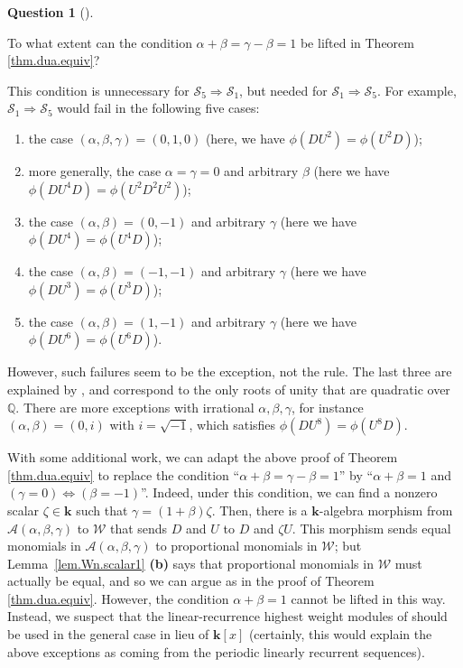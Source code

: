 \documentclass[numbers=enddot,12pt,final,onecolumn,notitlepage]{scrartcl}%
\theoremstyle{definition}
\newtheorem{quest}[theo]{Question}
\newenvironment{question}[1][]
{\begin{quest}[#1]\begin{leftbar}}
{\end{leftbar}\end{quest}}
\newcommand{\W}{\mathcal{W}}
\newcommand{\kk}{\mathbf{k}}
\newcommand{\QQ}{\mathbb{Q}}
\newcommand{\tup}[1]{\left( #1 \right)}
\newcommand{\ive}[1]{\left[ #1 \right]}
\begin{document}
\begin{question}
To what extent can the condition $\alpha+\beta=\gamma-\beta=1$ be lifted in
Theorem \ref{thm.dua.equiv}?
\end{question}

This condition is unnecessary for $\mathcal{S}_{5}\Longrightarrow
\mathcal{S}_{1}$, but needed for $\mathcal{S}_{1}\Longrightarrow
\mathcal{S}_{5}$. For example, $\mathcal{S}_{1}\Longrightarrow\mathcal{S}_{5}$
would fail in the following five cases:
\begin{enumerate}
\item the case $\tup{\alpha, \beta, \gamma} = \tup{0, 1, 0}$ (here, we have $\phi\tup{DU^2} = \phi\tup{U^2D}$);
\item more generally, the case $\alpha = \gamma = 0$ and arbitrary $\beta$ (here we have $\phi\tup{DU^4D} = \phi\tup{U^2D^2U^2}$);
\item the case $\tup{\alpha, \beta} = \tup{0, -1}$ and arbitrary $\gamma$ (here we have $\phi\tup{DU^4} = \phi\tup{U^4D}$);
\item the case $\tup{\alpha, \beta} = \tup{-1, -1}$ and arbitrary $\gamma$ (here we have $\phi\tup{DU^3} = \phi\tup{U^3D}$);
\item the case $\tup{\alpha, \beta} = \tup{1, -1}$ and arbitrary $\gamma$ (here we have $\phi\tup{DU^6} = \phi\tup{U^6D}$).
\end{enumerate}
However, such failures seem to be the
exception, not the rule.
The last three are explained by \cite[Theorem 1.3 (f)]{Zhao99}, and correspond to the only roots of unity that are quadratic over $\QQ$.
There are more exceptions with irrational $\alpha, \beta, \gamma$, for instance $\tup{\alpha, \beta} = \tup{0, i}$ with $i = \sqrt{-1}$, which satisfies $\phi\tup{DU^8} = \phi\tup{U^8D}$.

With some additional work, we can adapt the above proof of Theorem \ref{thm.dua.equiv} to replace the condition ``$\alpha+\beta=\gamma-\beta=1$'' by ``$\alpha + \beta = 1$ and $\left(\gamma = 0\right) \Longleftrightarrow \left(\beta = -1\right)$''.
Indeed, under this condition, we can find a nonzero scalar $\zeta \in \kk$ such that $\gamma = \tup{1+\beta}\zeta$.
Then, there is a $\kk$-algebra morphism from $\mathcal{A}\tup{\alpha, \beta, \gamma}$ to $\W$ that sends $D$ and $U$ to $D$ and $\zeta U$.
This morphism sends equal monomials in $\mathcal{A}\tup{\alpha, \beta, \gamma}$ to proportional monomials in $\W$;
but Lemma~\ref{lem.Wn.scalar1} \textbf{(b)} says that proportional monomials in $\W$ must actually be equal, and so we can argue as in the proof of Theorem \ref{thm.dua.equiv}.
However, the condition $\alpha + \beta = 1$ cannot be lifted in this way.
Instead, we suspect that the linear-recurrence highest weight modules of \cite[Proposition 2.2]{BenRob98} should be used in the general case in lieu of $\kk\ive{x}$ (certainly, this would explain the above exceptions as coming from the periodic linearly recurrent sequences).
\end{document}
